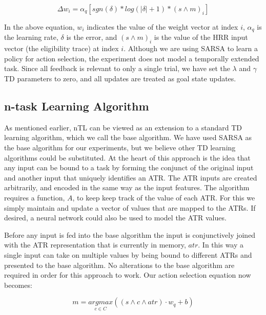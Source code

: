 \documentclass[10pt,letterpaper]{article}
\begin{document}
\begin{equation}
\Delta w_i = \alpha_q [sgn(\delta) * log(| \delta | + 1) * (s \wedge m)_i]
\label{eq:weight_update_transform}
\end{equation}

In the above equation, $ w_i $ indicates the value of the weight vector at index $ i $, $ \alpha_q $ is the learning rate, $ \delta $ is the error, and $ (s \wedge m)_i $ is the value of the HRR input vector (the eligibility trace) at index $ i $. Although we are using SARSA to learn a policy for action selection, the experiment does not model a temporally extended task. Since all feedback is relevant to only a single trial, we have set the $\lambda$ and $\gamma$ TD parameters to zero, and all updates are treated as goal state updates.

\subsection{n-task Learning Algorithm}
\label{sec:n-task}

As mentioned earlier, nTL can be viewed as an extension to a standard TD learning algorithm, which we call the base algorithm. We have used SARSA as the base algorithm for our experiments, but we believe other TD learning algorithms could be substituted. At the heart of this approach is the idea that any input can be bound to a task by forming the conjunct of the original input and another input that uniquely identifies an ATR. The ATR inputs are created arbitrarily, and encoded in the same way as the input features. The algorithm requires a function, $A$, to keep keep track of the value of each ATR. For this we simply maintain and update a vector of values that are mapped to the ATRs. If desired, a neural network could also be used to model the ATR values.
   
Before any input is fed into the base algorithm the input is conjunctively joined with the ATR representation that is currently in memory, $atr$. In this way a single input can take on multiple values by being bound to different ATRs and presented to the base algorithm. No alterations to the base algorithm are required in order for this approach to work. Our action selection equation now becomes:

\begin{equation}
m = \underset{c \in C}{argmax}((s \wedge c \wedge atr) \cdot w_{q}+b)
\label{eq:action_selection_atr}
\end{equation}
\end{document}
